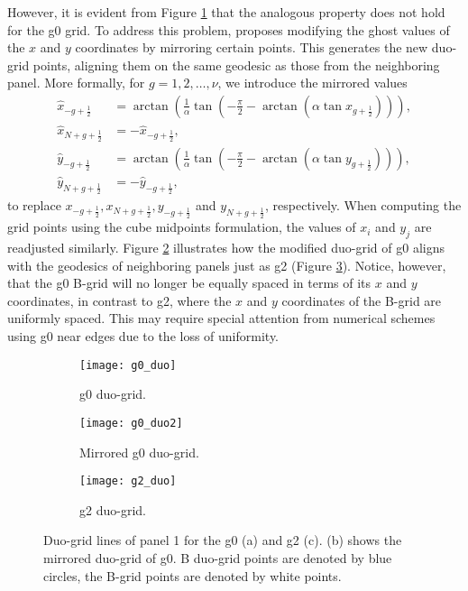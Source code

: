 However, it is evident from Figure \ref{cs-duo-g0} that the analogous property does not hold for the g0 grid.
To address this problem, \citet{chen:2021} proposes modifying the ghost values of the $x$ and $y$ coordinates by mirroring certain points. 
This generates the new duo-grid points, aligning them on the same geodesic as those from the neighboring panel.
More formally, for $g=1,2,\ldots,\nu$, we introduce the mirrored values
\begin{align}
	\hat{x}_{-g+\frac{1}{2}}  &= \arctan\left(\frac{1}{\alpha}\tan\left(-\frac{\pi}{2}-\arctan{(\alpha \tan{x_{g+\frac{1}{2}} })}\right)\right),\\
	\hat{x}_{N+g+\frac{1}{2}} &= -\hat{x}_{-g+\frac{1}{2}}, \\
	\hat{y}_{-g+\frac{1}{2}}  &= \arctan\left(\frac{1}{\alpha}\tan\left(-\frac{\pi}{2}-\arctan{(\alpha \tan{y_{g+\frac{1}{2}} })}\right)\right),\\
	\hat{y}_{N+g+\frac{1}{2}} &= -\hat{y}_{-g+\frac{1}{2}},
\end{align}
to replace ${x}_{-g+\frac{1}{2}},{x}_{N+g+\frac{1}{2}},{y}_{-g+\frac{1}{2}}$ and ${y}_{N+g+\frac{1}{2}}$, respectively.
When computing the grid points using the cube midpoints formulation, the values of $x_i$ and $y_j$ are readjusted similarly.
Figure \ref{cs-duo-g02} illustrates how the modified duo-grid of g0 aligns with the geodesics of neighboring panels just as g2 (Figure \ref{cs-duo-g2}).
Notice, however, that the g0 B-grid will no longer be equally spaced in terms of its $x$ and $y$ coordinates,
in contrast to g2, where the $x$ and $y$ coordinates of the B-grid are uniformly spaced.
This may require special attention from numerical schemes using g0 near edges due to the loss of uniformity.
\begin{figure}[!htb]
	\centering
	\begin{subfigure}{0.45\textwidth}
		\texttt{[image: g0\_duo]}
		\caption{g0 duo-grid.\label{cs-duo-g0}}
	\end{subfigure}
	\begin{subfigure}{0.45\textwidth}
		\centering
		\texttt{[image: g0\_duo2]}
		\caption{Mirrored g0 duo-grid.\label{cs-duo-g02}}
	\end{subfigure}
	\begin{subfigure}{0.45\textwidth}
		\centering
		\texttt{[image: g2\_duo]}
		\caption{g2 duo-grid.\label{cs-duo-g2}}
	\end{subfigure}
	\caption{Duo-grid lines of panel 1 for the g0 (a) and g2 (c). (b) shows the mirrored duo-grid of g0.
		B duo-grid points are denoted by blue circles, the B-grid points are denoted by white points.\label{cs-duo}}
\end{figure}


